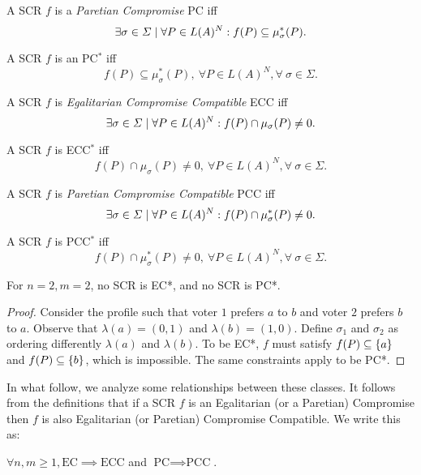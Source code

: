 \documentclass[version=3.21, pagesize, notitlepage, twoside=off, bibliography=totoc, DIV=calc, fontsize=12pt, a4paper]{scrartcl}
\newcommand{\musigma}{\mu_{\sigma}}
\newcommand{\mustar}{\mu_{\sigma}^*}
\begin{document}
\begin{definition} A SCR $f$ is a \textit{Paretian Compromise} PC iff \[\exists \sigma \in \Sigma \suchthat \forall P \in L(A)^N: f(P) \subseteq \mustar(P).\]
\end{definition}

\begin{definition} A SCR $f$ is an PC$^*$ iff \[f(P) \subseteq \mustar(P), \ \forall P \in L(A)^N, \forall \ \sigma \in \Sigma.\]
\end{definition}

\begin{definition} A SCR $f$ is \textit{Egalitarian Compromise Compatible} ECC iff \[\exists \sigma \in \Sigma \suchthat \forall P \in L(A)^N: f(P) \cap \musigma(P) \neq 0.\]
\end{definition}

\begin{definition} A SCR $f$ is ECC$^*$ iff \[f(P) \cap \musigma(P) \neq 0, \ \forall P \in L(A)^N, \forall \ \sigma \in \Sigma.\]
\end{definition}

\begin{definition} A SCR $f$ is \textit{Paretian Compromise Compatible} PCC iff \[\exists \sigma \in \Sigma \suchthat \forall P \in L(A)^N: f(P) \cap \mustar(P) \neq 0.\]
\end{definition}

\begin{definition} A SCR $f$ is PCC$^*$ iff \[ f(P) \cap \mustar(P) \neq 0, \ \forall P \in L(A)^N, \forall \ \sigma \in \Sigma.\]
\end{definition}

\begin{proposition}
	For $n=2, m=2$, no SCR is EC*, and no SCR is PC*.
\end{proposition}
\begin{proof}
	Consider the profile such that voter $1$ prefers $a$ to $b$ and voter $2$ prefers $b$ to $a$. Observe that $\lambda(a) = (0, 1)$ and $\lambda(b) = (1, 0)$. Define $\sigma_1$ and $\sigma_2$ as ordering differently $\lambda(a)$ and $\lambda(b)$. To be EC*, $f$ must satisfy $f(P) \subseteq \{a\}$ and $f(P) \subseteq \{b\}$, which is impossible. The same constraints apply to be PC*.
\end{proof}

In what follow, we analyze some relationships between these classes. It follows from the definitions that if a SCR $f$ is an Egalitarian (or a Paretian) Compromise then $f$ is also Egalitarian (or Paretian) Compromise Compatible. We write this as:
\begin{proposition}
	$\forall n, m ≥ 1, \text{EC} \implies \text{ECC}$ and $\text{PC} \implies \text{PCC}$.
\end{proposition}
\end{document}
